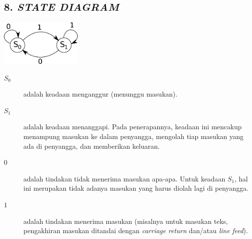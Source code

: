 \subsection*{\textcolor{subsectioncolor}{\textsf{8. \textit{STATE DIAGRAM}}}}


\includegraphics[width=0.3\textwidth]{DiagramKeadaan}

\begin{description}
\item[$S_{0}$] adalah keadaan menganggur (menunggu masukan).
\item[$S_{1}$] adalah keadaan menanggapi. Pada penerapannya, keadaan ini mencakup menampung masukan ke dalam penyangga, mengolah tiap masukan yang ada di penyangga, dan memberikan keluaran.
\item[$0$] adalah tindakan tidak menerima masukan apa-apa. Untuk keadaan $S_{1}$, hal ini merupakan tidak adanya masukan yang harus diolah lagi di penyangga.
\item[$1$] adalah tindakan menerima masukan (misalnya untuk masukan teks, pengakhiran masukan ditandai dengan \textit{carriage return} dan/atau \textit{line feed}).
\end{description}
